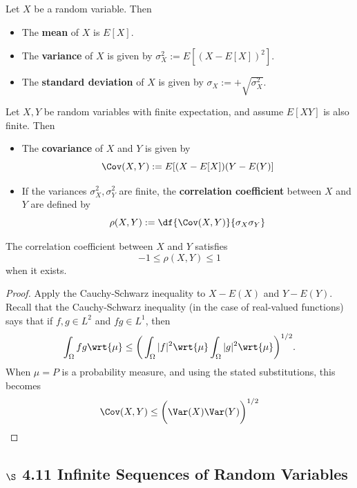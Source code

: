 \documentclass{article} %
\begin{document}
\begin{definition}
Let $X$ be a random variable.  Then 
\begin{itemize}
\item The \textbf{mean} of $X$ is $E[X]$.
\item The \textbf{variance} of $X$ is given by $\sigma^2_X:=E[(X-E[X])^2]$.
\item The \textbf{standard deviation} of $X$ is given by $\sigma_X:=+\sqrt{\sigma^2_X}$.
\end{itemize}
\end{definition}

\begin{definition}
Let $X, Y$ be random variables with finite expectation, and assume $E[XY]$ is also finite.  Then 
\begin{itemize}
\item The \textbf{covariance} of $X$ and $Y$ is given by
\[ \Cov(X,Y) := E[(X-E[X])(Y-E(Y)]\]
\item If the variances $\sigma^2_X, \sigma^2_Y$ are finite, the \textbf{correlation coefficient} between $X$ and $Y$ are defined by
\[ \rho(X,Y):= \df{\Cov(X,Y)}{\sigma_X \sigma_Y}\]
\end{itemize}
\end{definition}

\begin{proposition}
The correlation coefficient between $X$ and $Y$ satisfies
\[-1 \leq \rho(X,Y) \leq 1  \]	
when it exists.
\end{proposition}

\begin{proof}
Apply the Cauchy-Schwarz inequality to $X-E(X)$ and $Y-E(Y)$.\\

{\scriptsize Recall \cite[pp.85]{ash2000probability} that the Cauchy-Schwarz inequality (in the case of real-valued functions) says that if $f,g \in L^2$ and $fg \in L^1$, then 
\[ \int_\Omega fg \wrt{\mu} \leq \bigg( \int_\Omega |f|^2 \wrt{\mu} \int_\Omega |g|^2 \wrt{\mu} \bigg)^{1/2}.\]
When $\mu=P$ is a probability measure, and using the stated substitutions, this becomes
\[ \Cov(X,Y) \leq \bigg(\Var(X) \Var(Y) \bigg)^{1/2} \]
}

\end{proof}

\subsection{$\S$ 4.11 Infinite Sequences of Random Variables}
\end{document}
